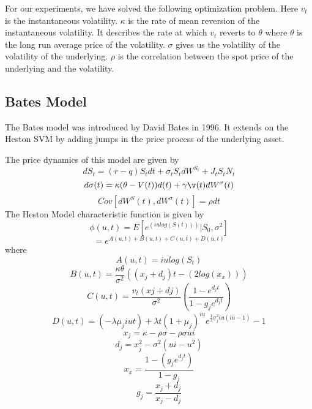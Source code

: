 \documentclass{article}
\begin{document}
For our experiments, we have solved the following optimization problem. Here $v_t$ is the instantaneous volatility. $\kappa$ is the rate of mean reversion of the instantaneous volatility. It describes the rate at which $v_t$ reverts to $\theta$ where $\theta$ is the long run average price of the volatility. $\sigma$ gives us the volatility of the volatility of the underlying. $\rho$ is the correlation between the spot price of the underlying and the volatility. 
\subsection{Bates Model}
The Bates model was introduced by David Bates in 1996. It extends on the Heston SVM by  adding jumps in the price process of the underlying asset. 


The price dynamics of this model are given by
\begin{equation}
dS_t = (r- q)S_t dt + \sigma_t S_t dW^{S_t} +J_t S_t N_t
\end{equation}
\begin{equation}
d\sigma(t) = \kappa(\theta-V(t))d(t) + \gamma\v(t)dW^\sigma(t)
\end{equation}
\begin{equation}
Cov[dW^S(t), dW^\sigma(t)] = \rho dt
\end{equation}
The Heston Model characteristic function is given by
\begin{equation}
    \phi(u,t) = E[e^{(iulog(S(t)))}|S_{0}, \sigma^2]
\end{equation}
\begin{equation}
    = e^{A(u,t)+B(u,t)+C(u,t)+D(u,t)}
\end{equation}
where
\begin{equation}
    A(u,t) = iulog(S_t)
\end{equation}
\begin{equation}
    B(u,t) = \frac{\kappa\theta}{\sigma^2}((x_j+d_j)t - (2log(x_x)) )
\end{equation}
\begin{equation}
    C(u,t) = \frac{v_t(xj+dj)}{\sigma^2} (\frac{1-e^{d_j t}}{ 1-g_je^{d_j t}})
\end{equation}
\begin{equation}
    D(u,t) = (-\lambda \mu_j i u t)+\lambda t(1+\mu_j)^{iu} e^{\frac{1}{2} \sigma_j ^2 iu(iu-1)}-1
\end{equation}
\begin{equation}
    x_j = \kappa-\rho\sigma-\rho\sigma ui
\end{equation}
\begin{equation}
    d_j = x_{j}^2 - \sigma^2(ui - u^2)
\end{equation}
\begin{equation}
    x_x = \frac{ 1-(g_j e^{d_j t})}{ 1-g_j}
\end{equation}
\begin{equation}
    g_j = \frac{x_j + d_j}{x_j - d_j}
\end{equation}
\end{document}
